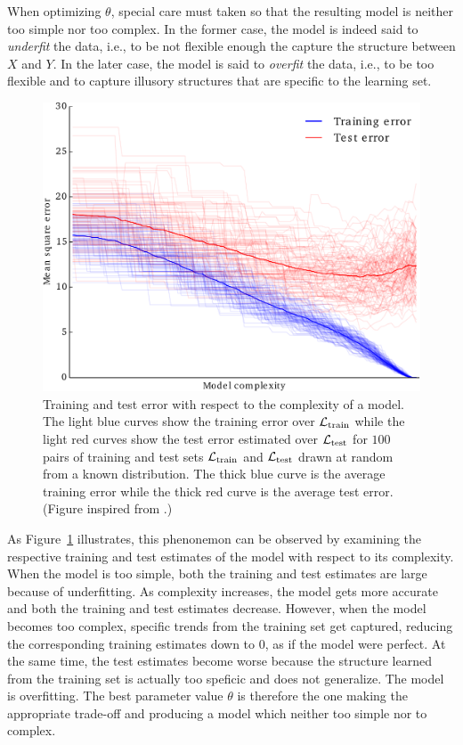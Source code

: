When optimizing $\theta$, special care must taken so that the resulting model
is neither too simple nor too complex. In the former case, the model is indeed
said to \textit{underfit} the data, i.e., to be not flexible enough the capture
the structure between $X$ and $Y$. In the later case, the model is said to
\textit{overfit} the data, i.e., to be too flexible and to capture illusory
structures that are specific to the learning set.

\begin{figure}
    \centering
    \includegraphics[scale=0.5]{figures/ch2_train_test_error.pdf}
    \caption{Training and test error with respect to the complexity
             of a model. The light blue curves show the training error over
             ${\cal L}_\text{train}$ while the light red curves show the test
             error estimated over ${\cal L}_\text{test}$ for $100$ pairs of training
             and test sets ${\cal L}_\text{train}$ and ${\cal L}_\text{test}$
             drawn at random from a known distribution. The thick blue curve
             is the average training error while the thick red curve is the
             average test error. (Figure inspired from \citep{hastie:2005}.) }
    \label{fig:train-test-error}
\end{figure}

As Figure~\ref{fig:train-test-error}
illustrates, this phenonemon can be observed by examining the
respective training and test estimates of the model with respect to its
complexity. When the model is too simple, both the training and test estimates
are large because of underfitting. As complexity increases, the model gets more
accurate and both the training and test estimates decrease. However, when the
model becomes too complex, specific trends from the training set get captured,
reducing the corresponding training estimates down to $0$, as if the model were
perfect. At the same time, the test estimates become worse because the
structure learned from the training set is actually too speficic and does not
generalize. The model is overfitting. The best parameter value $\theta$ is
therefore the one making the appropriate trade-off and producing a model which
neither too simple nor to complex.

